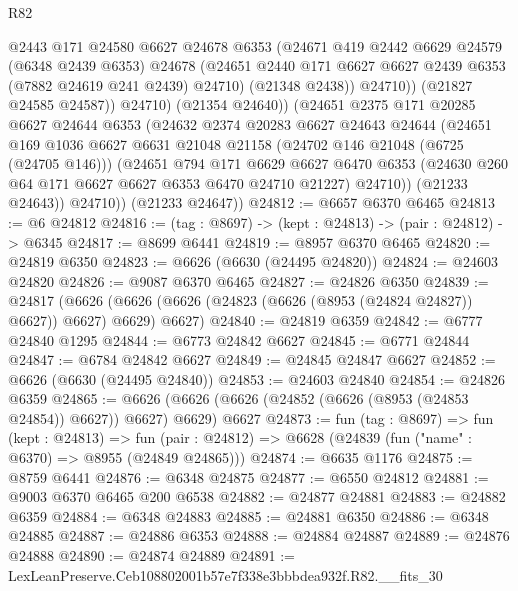 \begin{lexlean}{R82}
\begin{coremodule}
                  @2443
                  @171
                  @24580
                  @6627
                  @24678
                  @6353
                  (@24671
                    @419
                    @2442
                    @6629
                    @24579
                    (@6348 @2439 @6353)
                    @24678
                    (@24651 @2440 @171 @6627 @6627 @2439 @6353 (@7882 @24619 @241 @2439) @24710)
                    (@21348 @2438))
                  @24710))
              (@21827 @24585 @24587))
            @24710)
          (@21354 @24640))
        (@24651
          @2375
          @171
          @20285
          @6627
          @24644
          @6353
          (@24632
            @2374
            @20283
            @6627
            @24643
            @24644
            (@24651
              @169
              @1036
              @6627
              @6631
              @21048
              @21158
              (@24702 @146 @21048 (@6725 (@24705 @146)))
              (@24651
                @794
                @171
                @6629
                @6627
                @6470
                @6353
                (@24630 @260 @64 @171 @6627 @6627 @6353 @6470 @24710 @21227)
                @24710))
            (@21233 @24643))
          @24710))
      (@21233 @24647))
@24812 := @6657 @6370 @6465
@24813 := @6 @24812
@24816 := (tag : @8697) -> (kept : @24813) -> (pair : @24812) -> @6345
@24817 := @8699 @6441
@24819 := @8957 @6370 @6465
@24820 := @24819 @6350
@24823 := @6626 (@6630 (@24495 @24820))
@24824 := @24603 @24820
@24826 := @9087 @6370 @6465
@24827 := @24826 @6350
@24839 := @24817
    (@6626 (@6626 (@6626 (@24823 (@6626 (@8953 (@24824 @24827)) @6627)) @6627) @6629) @6627)
@24840 := @24819 @6359
@24842 := @6777 @24840 @1295
@24844 := @6773 @24842 @6627
@24845 := @6771 @24844
@24847 := @6784 @24842 @6627
@24849 := @24845 @24847 @6627
@24852 := @6626 (@6630 (@24495 @24840))
@24853 := @24603 @24840
@24854 := @24826 @6359
@24865 := @6626 (@6626 (@6626 (@24852 (@6626 (@8953 (@24853 @24854)) @6627)) @6627) @6629) @6627
@24873 := fun (tag : @8697) =>
  fun (kept : @24813) =>
  fun (pair : @24812) => @6628 (@24839 (fun ("name" : @6370) => @8955 (@24849 @24865)))
@24874 := @6635 @1176
@24875 := @8759 @6441
@24876 := @6348 @24875
@24877 := @6550 @24812
@24881 := @9003 @6370 @6465 @200 @6538
@24882 := @24877 @24881
@24883 := @24882 @6359
@24884 := @6348 @24883
@24885 := @24881 @6350
@24886 := @6348 @24885
@24887 := @24886 @6353
@24888 := @24884 @24887
@24889 := @24876 @24888
@24890 := @24874 @24889
@24891 := LexLeanPreserve.Ceb108802001b57e7f338e3bbbdea932f.R82.__fits_30

\end{coremodule}
\end{lexlean}
